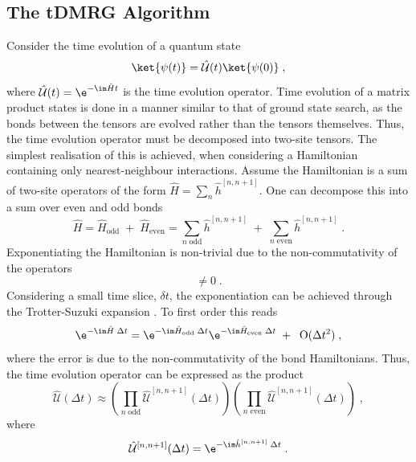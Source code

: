 \subsection{The tDMRG Algorithm}
Consider the time evolution of a quantum state
\begin{equation}
	\ket{\psi (t)} = \hat{\mathcal{U}}(t) \ket{\psi (0)} \; ,
\end{equation}
where $\hat{\mathcal{U}}(t) = \e^{ - \im \hat{H} t }$ is the time evolution operator. 
Time evolution of a matrix product states is done in a manner similar to that of ground state search, as the bonds between the tensors are evolved rather than the tensors themselves. Thus, the time evolution operator must be decomposed into two-site tensors. The simplest realisation of this is achieved, when considering a Hamiltonian containing only nearest-neighbour interactions.
Assume the Hamiltonian is a sum of two-site operators of the form $\hat{H} = \sum_{n} \hat{h}^{[n , n+1]}$. One can decompose this into a sum over even and odd bonds
\begin{equation}
	\hat{H} = \hat{H}_{\mathrm{odd}} \; + \; \hat{H}_{\mathrm{even}} = \sum_{n \; \mathrm{odd}} \hat{h}^{[n , n+1]} \; + \; \sum_{n \; \mathrm{even}} \hat{h}^{[n , n+1]} \; .
\end{equation}  
Exponentiating the Hamiltonian is non-trivial due to the non-commutativity of the operators
\begin{equation}
	[ \hat{h}_{\mathrm{odd}}^{[n , n+1]} \; , \; \hat{h}_{\mathrm{even}}^{[n , n+1]} ] \neq 0 \; .
\end{equation}
Considering a small time slice, $\delta t$, the exponentiation can be achieved through the Trotter-Suzuki expansion \cite{Suzuki1991}. To first order this reads
\begin{equation}
	\e^{- \im \hat{H} \; \Delta t} = \e^{- \im \hat{H}_{\mathrm{odd}} \; \Delta t } \e^{- \im \hat{H}_{\mathrm{even}} \; \Delta t} \; + \; \;  \mathrm{O}(\Delta t^2) \; ,
\end{equation}
where the error is due to the non-commutativity of the bond Hamiltonians. Thus, the time evolution operator can be expressed as the product
\begin{equation}
	\hat{\mathcal{U}}(\Delta t) \approx \left( \prod_{n \; \mathrm{odd}} \hat{\mathcal{U}}^{[n,n+1]} (\Delta t) \right) \left( \prod_{n \; \mathrm{even}} \hat{\mathcal{U}}^{[n,n+1]} (\Delta t) \right) \; ,
\end{equation}
where
\begin{equation}
	\hat{\mathcal{U}}^{[n,n+1]} (\Delta t) = \e^{- \im \hat{h}^{[n , n+1]} \; \Delta t } \; .
\end{equation}
